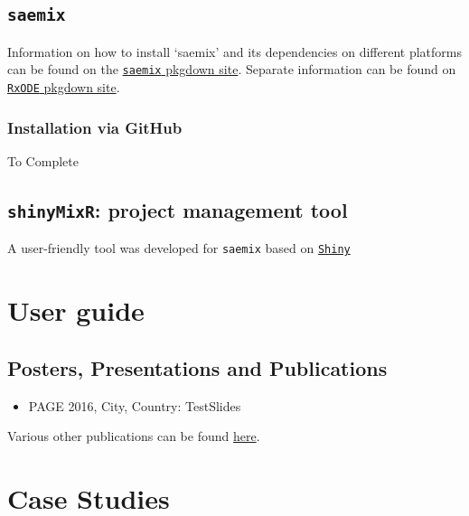 \documentclass[]{book}
\providecommand{\tightlist}{%
  \setlength{\itemsep}{0pt}\setlength{\parskip}{0pt}}
\begin{document}
\section{\texorpdfstring{\texttt{saemix}}{saemix}}\label{saemix}

Information on how to install `saemix' and its dependencies on different
platforms can be found on the
\href{https://saemixdevelopment.github.io/saemix/index.html}{\texttt{saemix}
pkgdown site}. Separate information can be found on
\href{https://saemixdevelopment.github.io/RxODE/index.html}{\texttt{RxODE}
pkgdown site}.

\subsection{Installation via GitHub}\label{installation-via-github}

To Complete

\section{\texorpdfstring{\texttt{shinyMixR}: project management
tool}{shinyMixR: project management tool}}\label{shinymixr-project-management-tool}

A user-friendly tool was developed for \texttt{saemix} based on
\href{http://shiny.rstudio.com/}{\texttt{Shiny}}

\chapter{User guide}\label{userguide}

\section{Posters, Presentations and
Publications}\label{posters-presentations-and-publications}

\begin{itemize}
\tightlist
\item
  PAGE 2016, City, Country: TestSlides
\end{itemize}

Various other publications can be found
\href{https://github.com/saemixdevelopment/Publications}{here}.

\chapter{Case Studies}\label{casestudies}
\end{document}
